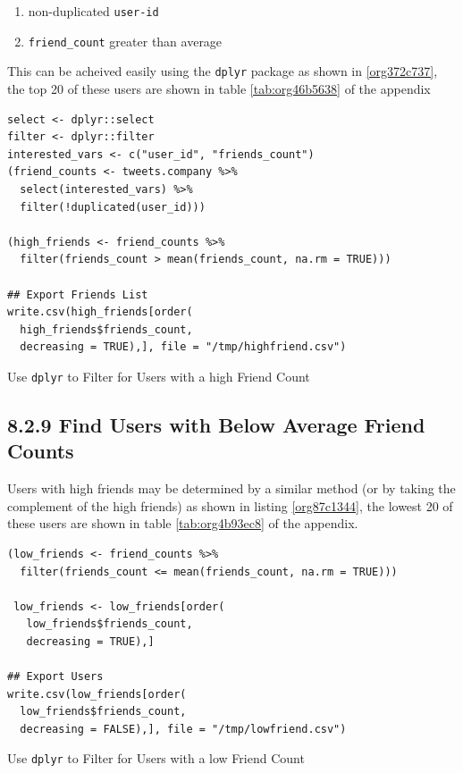 \documentclass[11pt]{article}
\begin{document}
\begin{enumerate}
\item non-duplicated \texttt{user-id}
\item \texttt{friend\_count} greater than average
\end{enumerate}

This can be acheived easily using the \texttt{dplyr} package as shown in \ref{org372c737}, the top 20 of these users are shown in table \ref{tab:org46b5638} of the appendix

\begin{listing}[htbp]
\begin{verbatim}
select <- dplyr::select
filter <- dplyr::filter
interested_vars <- c("user_id", "friends_count")
(friend_counts <- tweets.company %>%
  select(interested_vars) %>%
  filter(!duplicated(user_id)))

(high_friends <- friend_counts %>%
  filter(friends_count > mean(friends_count, na.rm = TRUE)))

## Export Friends List
write.csv(high_friends[order(
  high_friends$friends_count,
  decreasing = TRUE),], file = "/tmp/highfriend.csv")
\end{verbatim}
\caption{\label{org372c737}Use \texttt{dplyr} to Filter for Users with a high Friend Count}
\end{listing}

\subsection{8.2.9 Find Users with Below Average Friend Counts}
\label{sec:orgce307b5}
Users with high friends may be determined by a similar method (or by taking the complement of the high friends) as shown in listing \ref{org87c1344}, the lowest 20 of these users are shown in table \ref{tab:org4b93ec8} of the appendix.

\begin{listing}[htbp]
\begin{verbatim}
(low_friends <- friend_counts %>%
  filter(friends_count <= mean(friends_count, na.rm = TRUE)))

 low_friends <- low_friends[order(
   low_friends$friends_count,
   decreasing = TRUE),]

## Export Users
write.csv(low_friends[order(
  low_friends$friends_count,
  decreasing = FALSE),], file = "/tmp/lowfriend.csv")
\end{verbatim}
\caption{\label{org87c1344}Use \texttt{dplyr} to Filter for Users with a low Friend Count}
\end{listing}
\end{document}
